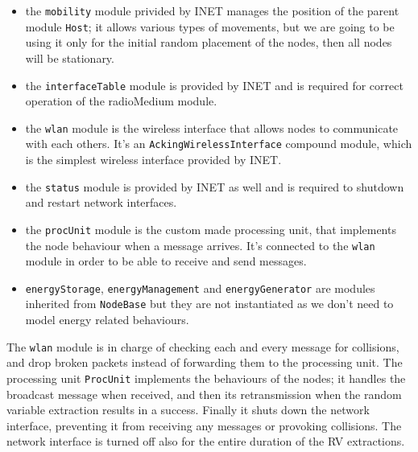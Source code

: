\begin{itemize}
    \item the \texttt{mobility} module privided by INET manages the position of
    the parent module \texttt{Host}; it allows various types of movements, but
    we are going to be using it only for the initial random placement of the
    nodes, then all nodes will be stationary.
    \item the \texttt{interfaceTable} module is provided by INET and is required
    for correct operation of the radioMedium module.
    \item the \texttt{wlan} module is the wireless interface that allows nodes
    to communicate with each others. It's an \texttt{AckingWirelessInterface}
    compound module, which is the simplest wireless interface provided by INET.
    \item the \texttt{status} module is provided by INET as well and is required
    to shutdown and restart network interfaces.
    \item the \texttt{procUnit} module is the custom made processing unit, that
    implements the node behaviour when a message arrives. It's connected to the
    \texttt{wlan} module in order to be able to receive and send messages.
    \item \texttt{energyStorage}, \texttt{energyManagement} and
    \texttt{energyGenerator} are modules inherited from \texttt{NodeBase} but
    they are not instantiated as we don't need to model energy related
    behaviours.
\end{itemize}
The \texttt{wlan} module is in charge of checking each and every message for
collisions, and drop broken packets instead of forwarding them to the processing
unit. The processing unit \texttt{ProcUnit} implements the behaviours of the
nodes; it handles the broadcast message when received, and then its
retransmission when the random variable extraction results in a success. Finally
it shuts down the network interface, preventing it from receiving any messages
or provoking collisions. The network interface is turned off also for the entire
duration of the RV extractions.
